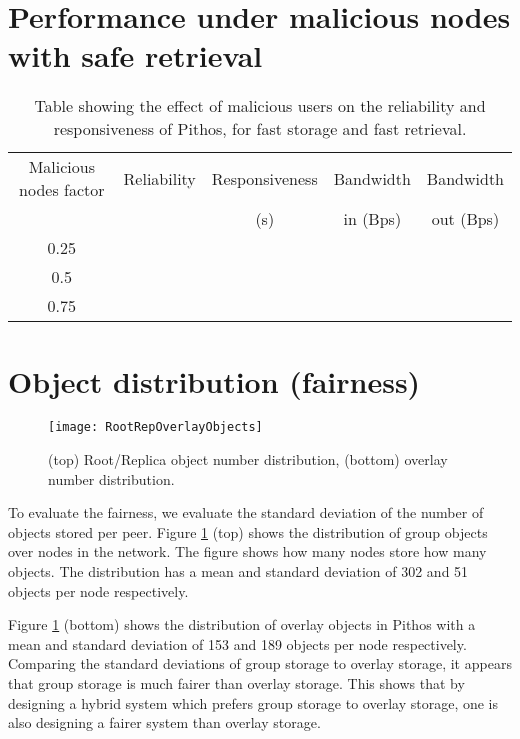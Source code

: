 \section{Performance under malicious nodes with safe retrieval}

\begin{table}[htbp]
\centering
\begin{tabular}{|c|c|c|c|c|}
\hline
Malicious nodes factor&Reliability&Responsiveness&Bandwidth&Bandwidth\\
                      &           &      (s)     &in (Bps) &out (Bps)\\
\hline
0.25   &     &    &   & \\
0.5    &     &    &   & \\
0.75   &     &    &   &\\
\hline
\end{tabular}
\caption{Table showing the effect of malicious users on the reliability and responsiveness of Pithos, for fast storage and fast retrieval.}
\label{tab_malicious_results}
\end{table}

\section{Object distribution (fairness)}

\begin{figure}[htbp]
 \centering
 \texttt{[image: RootRepOverlayObjects]}
 \caption{(top) Root/Replica object number distribution, (bottom) overlay number distribution.}
 \label{fig_group_overlay_objects}
\end{figure}
%
To evaluate the fairness, we evaluate the standard deviation of the number of objects stored per peer. Figure \ref{fig_group_overlay_objects} (top)
shows the distribution of group objects over nodes in the network. The figure shows how many nodes store how many objects. The distribution has a
mean and standard deviation of 302 and 51 objects per node respectively.

Figure \ref{fig_group_overlay_objects} (bottom) shows the distribution of overlay objects in Pithos with a mean and standard deviation of 153 and 189
objects per node respectively. Comparing the standard deviations of group storage to overlay storage, it appears that group storage is much fairer
than overlay storage. This shows that by designing a hybrid system which prefers group storage to overlay storage, one is also designing a fairer
system than overlay storage.


